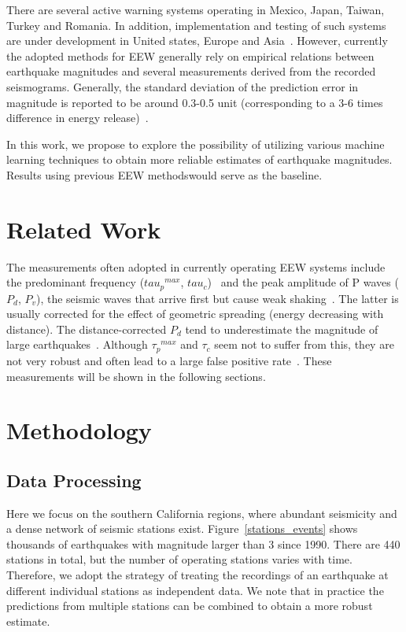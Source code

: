 \documentclass{article} %
\begin{document}
There are several active warning systems operating in Mexico, Japan, Taiwan, Turkey and Romania. In addition, implementation and testing of such systems are under development in United states, Europe and Asia~\cite{Allen2009, Strauss2016}. However, currently the adopted methods for EEW generally rely on empirical relations between earthquake magnitudes and several measurements derived from the recorded seismograms. Generally, the standard deviation of the prediction error in magnitude is reported to be around 0.3-0.5 unit (corresponding to a 3-6 times difference in energy release)~\cite{Bose2013}. 

In this work, we propose to explore the possibility of utilizing various machine learning techniques to obtain more reliable estimates of earthquake magnitudes. Results using previous EEW methodswould serve as the baseline.


\section{Related Work}
 The measurements often adopted in currently operating EEW systems include the predominant frequency (${tau_p}^{max}$, $tau_c$)~\cite{Allen2003, Kanamori2005} and the peak amplitude of P waves ($P_d$, $P_v$), the seismic waves that arrive first but cause weak shaking~\cite{Wurman2007}. The latter is usually corrected for the effect of geometric spreading (energy decreasing with distance). The distance-corrected $P_d$ tend to underestimate the magnitude of large earthquakes~\cite{Wurman2007}. Although ${\tau_p}^{max}$ and $\tau_c$ seem not to suffer from this, they are not very robust and often lead to a large false positive rate~\cite{Wurman2007}. These measurements will be shown in the following sections.  

\section{Methodology}
\subsection{Data Processing}
Here we focus on the southern California regions, where abundant seismicity and a dense network of seismic stations exist. Figure~\ref{stations_events} shows thousands of earthquakes with magnitude larger than 3 since 1990. There are 440 stations in total, but the number of operating stations varies with time. Therefore, we adopt the strategy of treating the recordings of an earthquake at different individual stations as independent data. We note that in practice the predictions from multiple stations can be combined to obtain a more robust estimate.   
\end{document}
